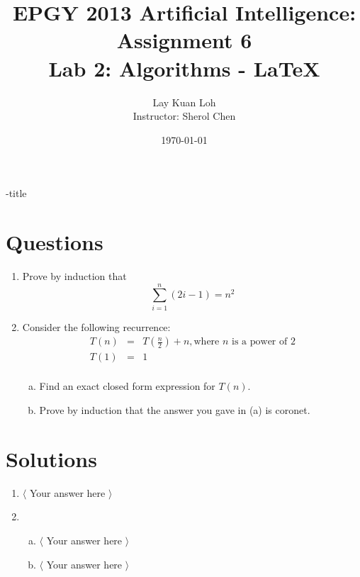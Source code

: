 \documentclass[12pt]{article}
\begin{document}

\title{EPGY 2013 Artificial Intelligence: \\
       Assignment 6 \\
       Lab 2: Algorithms - \LaTeX}
\author{Lay Kuan Loh \\
	Instructor: Sherol Chen}
\date{\today}
\make-title



\section{Questions}


\begin{enumerate}[1.]
  \item Prove by induction that
	$$\sum_{i=1}^n (2i-1) = n^2$$
  \item Consider the following recurrence:
	\begin{eqnarray*}
	  T(n) &=& T\left(\frac{n}{2}\right)+n, \text{where $n$ is a power of 2} \\
	  T(1) &=& 1 \\
	\end{eqnarray*}
   	\begin{enumerate}[(a)]
	  \item Find an exact closed form expression for $T(n)$.
	  \item Prove by induction that the answer you gave in (a) is coronet.
	\end{enumerate}
\end{enumerate}



\section{Solutions}

\begin{enumerate}[1.]
  \item $\langle$ Your answer here $\rangle$
  \item \begin{enumerate}[(a)]
	  \item $\langle$ Your answer here $\rangle$
	  \item $\langle$ Your answer here $\rangle$
	\end{enumerate}
\end{enumerate}

\end{document}
